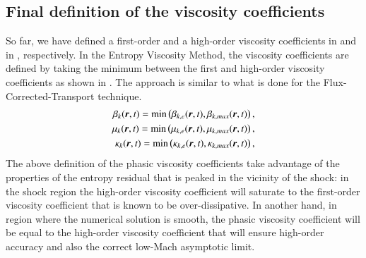 \documentclass[preprint,10pt]{elsarticle}
\begin{document}
\subsection{Final definition of the viscosity coefficients}\label{sec:visc-coeff}
%
So far, we have defined a first-order and a high-order viscosity coefficients in  and in , respectively. In the Entropy Viscosity Method, the viscosity coefficients are defined by taking the minimum between the first and high-order viscosity coefficients as shown in . The approach is similar to what is done for the Flux-Corrected-Transport technique.
%
\begin{align}\label{eq:def-visc-sem}
\beta_k( \boldsymbol r, t) = \min \left( \beta_{k,e}( \boldsymbol r, t), \beta_{k,max} ( \boldsymbol r, t) \right), \nonumber \\
\mu_k( \boldsymbol r, t) = \min \left( \mu_{k,e}( \boldsymbol r, t), \mu_{k,max} ( \boldsymbol r, t) \right),  \\
\kappa_k( \boldsymbol r, t) = \min \left( \kappa_{k,e}( \boldsymbol r, t), \kappa_{k,max} ( \boldsymbol r, t) \right) ,\nonumber 
\end{align}
%
The above definition of the phasic viscosity coefficients take advantage of the properties of the entropy residual that is peaked in the vicinity of the shock: in the shock region the high-order viscosity coefficient will saturate to the first-order viscosity coefficient that is known to be over-dissipative. In another hand, in region where the numerical solution is smooth, the phasic viscosity coefficient will be equal to the high-order viscosity coefficient that will ensure high-order accuracy and also the correct low-Mach asymptotic limit.
\end{document}
